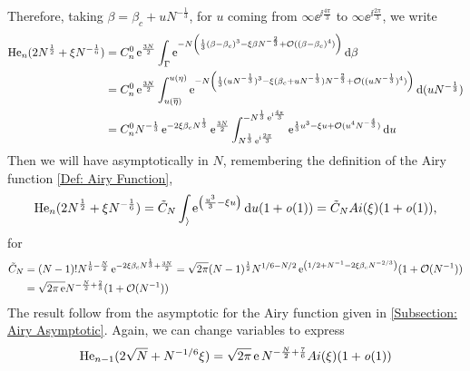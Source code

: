 Therefore, taking $\beta = \beta_c + u N^{-\frac{1}{3}}$, for $u$ coming from $\infty \ee^{\ii \frac{4\pi}{3}}$ to $\infty \ee^{\ii \frac{2\pi}{3}}$, we write
\begin{align}
	\mathrm{He}_n(2 N^{\frac{1}{2}} + \xi N^{-\frac{1}{6}}) & = 
	C_n^0 \operatorname{e}^{\frac{3N}{2}} 
	\int_{\Gamma}  
	\operatorname{e}^{-N 
	\left(
	\frac{1}{3}(\beta - \beta_c)^3 - \xi \beta N^{-\frac{2}{3}} + \mathcal{O}((\beta - \beta_c)^4) 
	\right)}
	\mathrm{d} \beta 
	\\
 	& = C_n^0 \operatorname{e}^{\frac{3N}{2}} 
 	\int_{u(\overline{\eta})}^{u(\eta)}
 	\operatorname{e}^{-N \left(\frac{1}{3}(u N^{-\frac{1}{3}})^3 - \xi (\beta_c + u N^{-\frac{1}{3}}) N^{-\frac{2}{3}} + 
 	\mathcal{O}((u N^{-\frac{1}{3}})^4) \right)} \mathrm{d} (u N^{-\frac{1}{3}})
 	\\
	& = C_n^0 N^{-\frac{1}{3}} \operatorname{e}^{-2\xi\beta_c N^{\frac{1}{3}}} \operatorname{e}^{\frac{3N}{2}}
	\int_{N^{\frac{1}{3}} \operatorname{e}^{\mathrm{i} \frac{2\pi}{3}}}^{-N^{\frac{1}{3}} \operatorname{e}^{\mathrm{i} \frac{4\pi}{3}}}  \operatorname{e}^{\frac{1}{3} u^3 - \xi u + \mathcal{O}(u^4 N^{-\frac{4}{3}})} \mathrm{d} u
\end{align}
Then we will have asymptotically in $N$, remembering the definition of the Airy function \ref{Def: Airy Function},
\begin{equation}
	\mathrm{He}_n(2N^{\frac{1}{2}} + \xi N^{-\frac{1}{6}}) = \tilde{C}_N \int_{\rangle}  \operatorname{e}^{\left(\frac{u^3}{3} - \xi u\right)} \mathrm{d} u (1 + \mathit{o}(1)) = \tilde{C}_N Ai(\xi) (1 + \mathit{o}(1)),
\end{equation}
for
\begin{align}
	\tilde{C}_N & = (N-1)! N^{\frac{1}{6} - \frac{N}{2}} \operatorname{e}^{-2\xi\beta_c N^{\frac{1}{3}} + \frac{3N}{2}} = \sqrt{2\pi} (N-1)^{\frac{1}{2}} N^{1/6 - N/2} \operatorname{e}^{\left(1/2 + N^{-1} - 2\xi \beta_c N^{-2/3} \right)} (1 + \mathcal{O}(N^{-1})) \\
	& = \sqrt{2\pi\operatorname{e}} N^{-\frac{N}{2} + \frac{2}{3}} (1 + \mathcal{O}(N^{-1})) 
\end{align} 
The result follow from the asymptotic for the Airy function given in \ref{Subsection: Airy Asymptotic}. Again, we can change variables to express
\begin{equation}
	\mathrm{He}_{n-1}(2\sqrt{N} + N^{-1/6}\xi) = \sqrt{2\pi} \operatorname{e} N^{-\frac{N}{2} + \frac{7}{6}}  Ai(\xi) (1 + \mathit{o}(1))
\end{equation}

